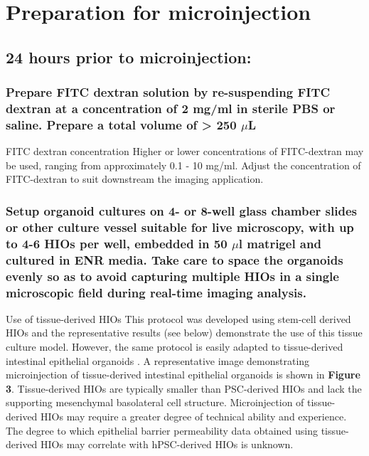 \documentclass[11pt]{article}
\begin{document}
\section{{\sffamily } Preparation for microinjection}
\label{sec:orgheadline42}

\subsection{{\sffamily } 24 hours prior to microinjection:}
\label{sec:orgheadline13}
\subsubsection{{\sffamily } Prepare FITC dextran solution by re-suspending FITC dextran at a concentration of 2 mg/ml in sterile PBS or saline. Prepare a total volume of > 250 \(\mu\)L}
\label{sec:orgheadline11}
\begin{bclogo}[logo=\bcinfo, couleurBarre=Black, noborder=true, couleur=gray!10]{     FITC dextran concentration}
Higher or lower concentrations of FITC-dextran may be used, ranging from approximately 0.1 - 10 mg/ml. Adjust the concentration of FITC-dextran to suit downstream the imaging application.\\
\end{bclogo}

\subsubsection{{\sffamily } Setup organoid cultures on 4- or 8-well glass chamber slides or other culture vessel suitable for live microscopy, with up to 4-6 HIOs per well, embedded in 50 \(\mu\)l matrigel and cultured in ENR media. Take care to space the organoids evenly so as to avoid capturing multiple HIOs in a single microscopic field during real-time imaging analysis.}
\label{sec:orgheadline12}
\begin{bclogo}[logo=\bcinfo, couleurBarre=Black, noborder=true, couleur=gray!10]{     Use of tissue-derived HIOs}
This protocol was developed using stem-cell derived HIOs and the representative results (see below) demonstrate the use of this tissue culture model. However, the same protocol is easily adapted to tissue-derived intestinal epithelial organoids \supercite{Sato:2009,Miyoshi:2013}. A representative image demonstrating microinjection of tissue-derived intestinal epithelial organoids is shown in \textbf{Figure 3}. Tissue-derived HIOs are typically smaller than PSC-derived HIOs and lack the supporting mesenchymal basolateral cell structure\supercite{Sato:2009,Miyoshi:2013,Sato:2011}. Microinjection of tissue-derived HIOs may require a greater degree of technical ability and experience. The degree to which epithelial barrier permeability data obtained using tissue-derived HIOs may correlate with hPSC-derived HIOs is unknown.\\
\end{bclogo}
\end{document}
